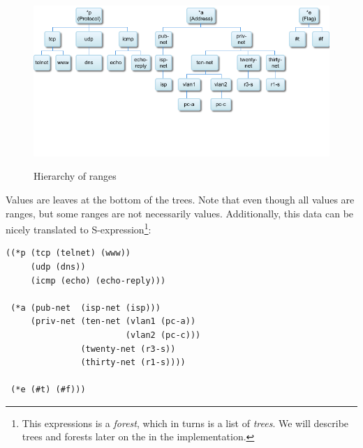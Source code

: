 \begin{figure}
    {\includegraphics[width=\textwidth]
    {figures/hier.png}}
    \caption{\label{hier} Hierarchy of ranges}
\end{figure}

Values are leaves at the bottom of the trees. Note that even though all values are ranges, but some ranges are not necessarily values. Additionally, this data can be nicely translated to S-expression\footnote{This expressions is a \textit{forest}, which in turns is a list of \textit{trees}. We will describe trees and forests later on the in the implementation.}:
\begin{lstlisting}
((*p (tcp (telnet) (www))
     (udp (dns))
     (icmp (echo) (echo-reply)))
     
 (*a (pub-net  (isp-net (isp)))
     (priv-net (ten-net (vlan1 (pc-a))
                        (vlan2 (pc-c)))
               (twenty-net (r3-s))
               (thirty-net (r1-s))))
               
 (*e (#t) (#f)))
\end{lstlisting}

